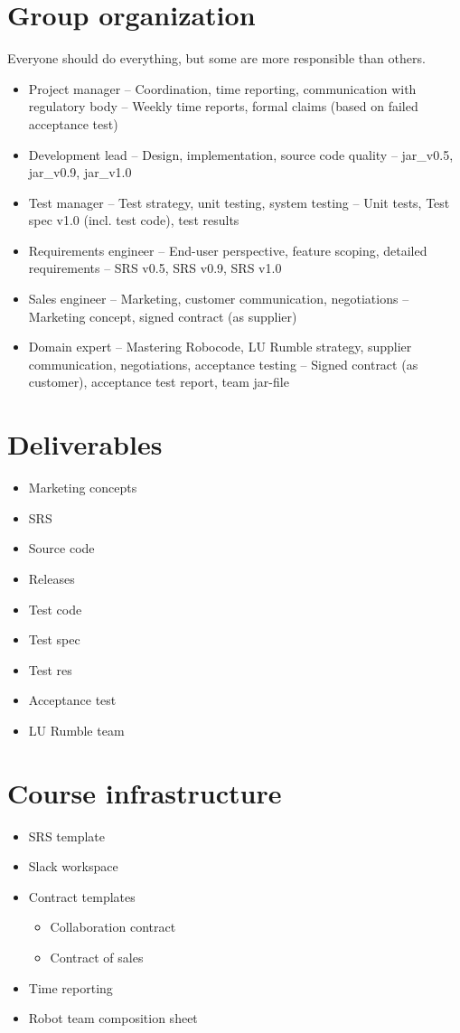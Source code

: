 \documentclass{scrreprt}
\begin{document}
\chapter{Group organization} \label{sec:org}
Everyone should do everything, but some are more responsible than others.

\begin{itemize}
\item Project manager -- Coordination, time reporting, communication with regulatory body -- Weekly time reports, formal claims (based on failed acceptance test)
\item Development lead -- Design, implementation, source code quality -- jar_v0.5, jar_v0.9, jar_v1.0
\item Test manager -- Test strategy, unit testing, system testing -- Unit tests, Test spec v1.0 (incl. test code), test results
\item Requirements engineer -- End-user perspective, feature scoping, detailed requirements -- SRS v0.5, SRS v0.9, SRS v1.0
\item Sales engineer -- Marketing, customer communication, negotiations -- Marketing concept, signed contract (as supplier)
\item Domain expert -- Mastering Robocode, LU Rumble strategy, supplier communication, negotiations, acceptance testing -- Signed contract (as customer), acceptance test report, team jar-file
\end{itemize}

\chapter{Deliverables}
\begin{itemize}
\item Marketing concepts
\item SRS
\item Source code
\item Releases
\item Test code
\item Test spec
\item Test res
\item Acceptance test
\item LU Rumble team
\end{itemize}

\chapter{Course infrastructure}
\begin{itemize}
\item SRS template
\item Slack workspace
\item Contract templates
\begin{itemize}
\item Collaboration contract
\item Contract of sales
\end{itemize}
\item Time reporting
\item Robot team composition sheet
\end{itemize}
\end{document}
